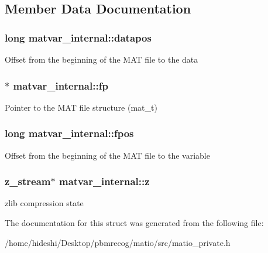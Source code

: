 \subsection{\-Member \-Data \-Documentation}
\hypertarget{structmatvar__internal_afd3bfaab126a160bd6855563e1ea0a7e}{
\subsubsection[{datapos}]{\setlength{\rightskip}{0pt plus 5cm}long {\bf matvar\-\_\-internal\-::datapos}}}\label{structmatvar__internal_afd3bfaab126a160bd6855563e1ea0a7e}
\-Offset from the beginning of the \-M\-A\-T file to the data \hypertarget{structmatvar__internal_a73f9faaa71fa20ca1cb48e32bcc67351}{
\subsubsection[{fp}]{$\ast$ {\bf matvar\-\_\-internal\-::fp}}}\label{structmatvar__internal_a73f9faaa71fa20ca1cb48e32bcc67351}
\-Pointer to the \-M\-A\-T file structure (mat\-\_\-t) \hypertarget{structmatvar__internal_af64eef69fa4be3b068789d816dedd619}{
\subsubsection[{fpos}]{\setlength{\rightskip}{0pt plus 5cm}long {\bf matvar\-\_\-internal\-::fpos}}}\label{structmatvar__internal_af64eef69fa4be3b068789d816dedd619}
\-Offset from the beginning of the \-M\-A\-T file to the variable \hypertarget{structmatvar__internal_a65fb91d70ebba50dd69f6433a5ef2461}{
\subsubsection[{z}]{\setlength{\rightskip}{0pt plus 5cm}z\-\_\-stream$\ast$ {\bf matvar\-\_\-internal\-::z}}}\label{structmatvar__internal_a65fb91d70ebba50dd69f6433a5ef2461}
zlib compression state 

\-The documentation for this struct was generated from the following file\-:\begin{DoxyCompactItemize}
\item 
/home/hideshi/\-Desktop/pbmrecog/matio/src/matio\-\_\-private.\-h\end{DoxyCompactItemize}

